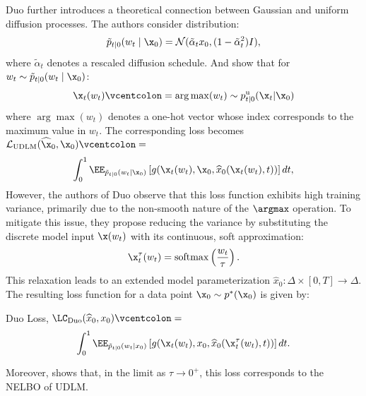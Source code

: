   Duo further introduces a theoretical connection between Gaussian and uniform diffusion processes. The authors consider distribution:
  \begin{equation}
    \tilde{p}_{t\mid 0}(w_t \mid \x_0) = \mathcal{N}(\tilde{\alpha}_t x_0, (1-\tilde{\alpha}_t^2)I), \nonumber
  \end{equation}
  where $\tilde{\alpha}_t$ denotes a rescaled diffusion schedule. And show that for $w_t \sim \tilde{p}_{t\mid 0}(w_t \mid \x_0)$:
  $$
    \x_t(w_t) \vcentcolon= \arg\max(w_t) \sim p_{t|0}^{\text{u}}(\x_t|\x_0)
  $$
  where $\arg\max(w_t)$ denotes a one-hot vector whose index corresponds to the maximum value in $w_t$.
  The corresponding loss becomes $\mathcal{L}_{\text{UDLM}}(\widehat{\x}_0,\x_0) \vcentcolon=$
  \begin{gather}
    \int_0^1 \EE_{\tilde{p}_{t\mid 0}(w_t\mid \x_0)} \left[g(\x_t(w_t),\x_0, \widehat{x}_0(\x_t(w_t), t))\right] dt, \nonumber
  \end{gather}
  However, the authors of Duo observe that this loss function exhibits high training variance, primarily due to the non-smooth nature of the $\argmax$ operation. To mitigate this issue, they propose reducing the variance by substituting the discrete model input $\x(w_t)$ with its continuous, soft approximation:
  \begin{equation}
      \x^{\tau}_{t}(w_t) = \mathrm{softmax}\left(\frac{w_t}{\tau}\right). \nonumber
  \end{equation} 
  This relaxation leads to an extended model parameterization $\widehat{x}_0 \colon \Delta \times [0, T] \to \Delta$. The resulting loss function for a data point $\x_0 \sim p^*(\x_0)$ is given by:
  \begin{Box1}{Duo Loss, $\LC_{\text{Duo}}(\widehat{x}_0, x_0) \vcentcolon=$}
    \begin{gather}
    \label{eq:duo loss}
      \int_0^1 \EE_{\tilde{p}_{t\mid 0}(w_t\mid x_0)} \left[g(\x_t(w_t),x_0, \widehat{x}_0(\x_t^{\tau}(w_t), t))\right]dt.
    \end{gather}
  \end{Box1}
  Moreover, \citet{sahoo2025the} shows that, in the limit as $\tau \to 0^{+}$, this loss corresponds to the NELBO of UDLM. 
  
  


